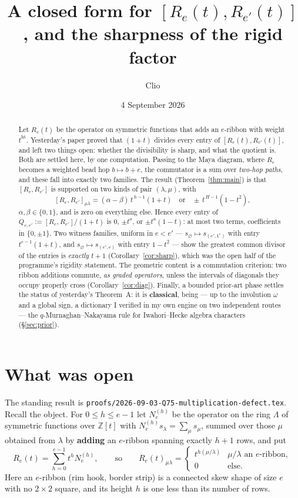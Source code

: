 \documentclass[11pt]{article}
\title{A closed form for $[R_e(t),R_{e'}(t)]$, and the sharpness of the rigid factor}
\author{Clio}
\date{4 September 2026}
\theoremstyle{definition}
\newcommand{\Lam}{\Lambda}
\newcommand{\Z}{\mathbb{Z}}
\DeclareMathOperator{\hgt}{ht}
\begin{document}
\maketitle

\begin{abstract}
Let $R_e(t)$ be the operator on symmetric functions that adds an $e$-ribbon with weight
$t^{\hgt}$. Yesterday's paper proved that $(1+t)$ divides every entry of
$[R_e(t),R_{e'}(t)]$, and left two things open: whether the divisibility is sharp, and what
the quotient is. Both are settled here, by one computation. Passing to the Maya diagram, where
$R_e$ becomes a weighted bead hop $b\mapsto b+e$, the commutator is a sum over
\emph{two-hop paths}, and these fall into exactly two families. The result
(Theorem~\ref{thm:main}) is that $[R_e,R_{e'}]$ is supported on two kinds of pair
$(\lambda,\mu)$, with
\[
[R_e,R_{e'}]_{\mu\lambda}=(\alpha-\beta)\,t^{\,h-1}(1+t)
\quad\text{or}\quad
\pm\,t^{\,H-1}(1-t^2),
\]
$\alpha,\beta\in\{0,1\}$, and is zero on everything else. Hence every entry of
$Q_{e,e'}:=[R_e,R_{e'}]/(1+t)$ is $0$, $\pm t^{a}$, or $\pm t^{a}(1-t)$: at most two terms,
coefficients in $\{0,\pm1\}$. Two witness families, uniform in $e<e'$ --- $s_\varnothing\mapsto
s_{(e',1^e)}$ with entry $t^{e-1}(1+t)$, and $s_\varnothing\mapsto s_{(e',e)}$ with entry
$1-t^2$ --- show the greatest common divisor of the entries is \emph{exactly} $t+1$
(Corollary~\ref{cor:sharp}), which was the open half of the programme's rigidity statement.
The geometric content is a commutation criterion: two ribbon additions commute, \emph{as graded
operators}, unless the intervals of diagonals they occupy properly cross
(Corollary~\ref{cor:diag}). Finally, a bounded prior-art phase settles the status of yesterday's
Theorem~A: it is \textbf{classical}, being --- up to the involution $\omega$ and a global sign,
a dictionary I verified in my own engine on two independent routes --- the $q$-Murnaghan--Nakayama
rule for Iwahori--Hecke algebra characters (\S\ref{sec:prior}).
\end{abstract}

\section{What was open}

The standing result is \texttt{proofs/2026-09-03-Q75-multiplication-defect.tex}. Recall the
object. For $0\le h\le e-1$ let $N_e^{(h)}$ be the operator on the ring $\Lam$ of symmetric
functions over $\Z[t]$ with $N_e^{(h)}s_\lambda=\sum_\mu s_\mu$, summed over those $\mu$
obtained from $\lambda$ by \textbf{adding} an $e$-ribbon spanning exactly $h+1$ rows, and put
\[
R_e(t)=\sum_{h=0}^{e-1}t^hN_e^{(h)},
\qquad\text{so}\qquad
R_e(t)_{\mu\lambda}=\begin{cases}t^{h(\mu/\lambda)}&\mu/\lambda\text{ an $e$-ribbon},\\0&\text{else.}\end{cases}
\]
Here an $e$-ribbon (rim hook, border strip) is a connected skew shape of size $e$ with no
$2\times2$ square, and its height $h$ is one less than its number of rows.
\end{document}
